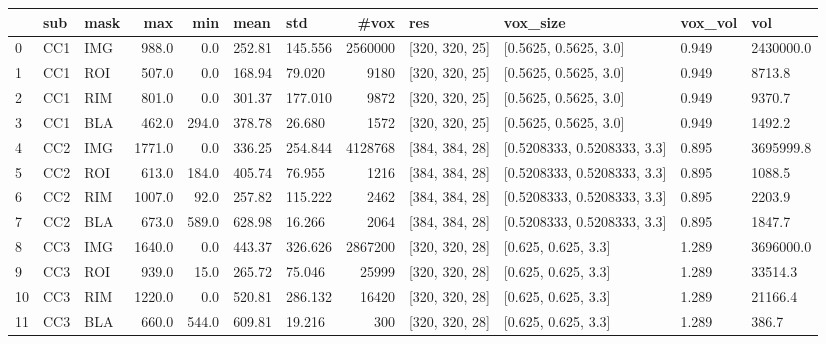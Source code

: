 \begin{tabular}{lllrrllrllll}
\toprule
{} &  sub & mask &     max &    min &    mean &      std &     \#vox &             res &                     vox\_size & vox\_vol &        vol \\
\midrule
0  &  CC1 &  IMG &   988.0 &    0.0 &  252.81 &  145.556 &  2560000 &  [320, 320, 25] &        [0.5625, 0.5625, 3.0] &   0.949 &  2430000.0 \\
1  &  CC1 &  ROI &   507.0 &    0.0 &  168.94 &   79.020 &     9180 &  [320, 320, 25] &        [0.5625, 0.5625, 3.0] &   0.949 &     8713.8 \\
2  &  CC1 &  RIM &   801.0 &    0.0 &  301.37 &  177.010 &     9872 &  [320, 320, 25] &        [0.5625, 0.5625, 3.0] &   0.949 &     9370.7 \\
3  &  CC1 &  BLA &   462.0 &  294.0 &  378.78 &   26.680 &     1572 &  [320, 320, 25] &        [0.5625, 0.5625, 3.0] &   0.949 &     1492.2 \\
4  &  CC2 &  IMG &  1771.0 &    0.0 &  336.25 &  254.844 &  4128768 &  [384, 384, 28] &  [0.5208333, 0.5208333, 3.3] &   0.895 &  3695999.8 \\
5  &  CC2 &  ROI &   613.0 &  184.0 &  405.74 &   76.955 &     1216 &  [384, 384, 28] &  [0.5208333, 0.5208333, 3.3] &   0.895 &     1088.5 \\
6  &  CC2 &  RIM &  1007.0 &   92.0 &  257.82 &  115.222 &     2462 &  [384, 384, 28] &  [0.5208333, 0.5208333, 3.3] &   0.895 &     2203.9 \\
7  &  CC2 &  BLA &   673.0 &  589.0 &  628.98 &   16.266 &     2064 &  [384, 384, 28] &  [0.5208333, 0.5208333, 3.3] &   0.895 &     1847.7 \\
8  &  CC3 &  IMG &  1640.0 &    0.0 &  443.37 &  326.626 &  2867200 &  [320, 320, 28] &          [0.625, 0.625, 3.3] &   1.289 &  3696000.0 \\
9  &  CC3 &  ROI &   939.0 &   15.0 &  265.72 &   75.046 &    25999 &  [320, 320, 28] &          [0.625, 0.625, 3.3] &   1.289 &    33514.3 \\
10 &  CC3 &  RIM &  1220.0 &    0.0 &  520.81 &  286.132 &    16420 &  [320, 320, 28] &          [0.625, 0.625, 3.3] &   1.289 &    21166.4 \\
11 &  CC3 &  BLA &   660.0 &  544.0 &  609.81 &   19.216 &      300 &  [320, 320, 28] &          [0.625, 0.625, 3.3] &   1.289 &      386.7 \\
\bottomrule
\end{tabular}
